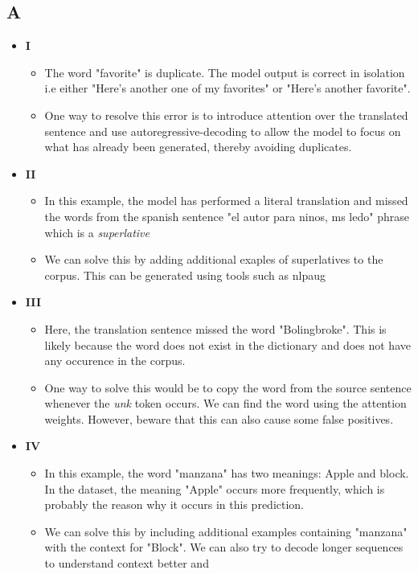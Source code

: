 \documentclass[a4paper]{article}
\begin{document}
\subsection{A}
\begin{itemize}
    \item \textbf{I}  
    \begin{itemize}
        \item The word "favorite" is duplicate. The model output is correct in isolation i.e either "Here's another one of my favorites" or "Here's another favorite". 
        \item One way to resolve this error is to introduce attention over the translated sentence and use autoregressive-decoding to allow the model to focus on what has already been generated, thereby avoiding duplicates.
    \end{itemize}
    \item \textbf{II}  
    \begin{itemize}
        \item In this example, the model has performed a literal translation and missed the words from the spanish sentence "el autor para ninos, ms ledo" phrase which is a \textit{superlative} 
        \item We can solve this by adding additional exaples of superlatives to the corpus. This can be generated using tools such as nlpaug
    \end{itemize}
    \item \textbf{III}  
    \begin{itemize}
        \item Here, the translation sentence missed the word "Bolingbroke". This is likely because the word does not exist in the dictionary and does not have any occurence in the corpus. 
        \item One way to solve this would be to copy the word from the source sentence whenever the \textit{unk} token occurs. We can find the word using the attention weights. However, beware that this can also cause some false positives.
    \end{itemize}
    \item \textbf{IV}  
    \begin{itemize}
        \item In this example, the word "manzana" has two meanings: Apple and block. In the dataset, the meaning "Apple" occurs more frequently, which is probably the reason why it occurs in this prediction.
        \item We can solve this by including additional examples containing "manzana" with the context for "Block". We can also try to decode longer sequences to understand context better and 

\end{itemize}
\end{itemize}
\end{document}
